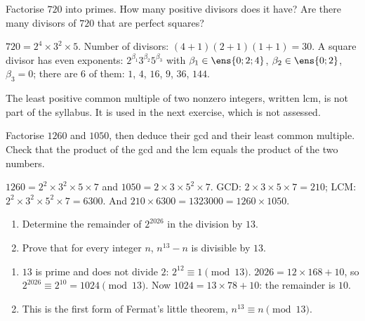 \begin{exercise}
Factorise $720$ into primes. How many positive divisors does it have? Are there many divisors of $720$ that are perfect squares?
\end{exercise}
\begin{solution}
$720=2^4\times3^2\times5$. Number of divisors: $(4+1)(2+1)(1+1)=30$. A square divisor has even exponents: $2^{\beta_1}3^{\beta_2}5^{\beta_3}$ with $\beta_1\in\ens{0;2;4}$, $\beta_2\in\ens{0;2}$, $\beta_3=0$; there are $6$ of them: $1$, $4$, $16$, $9$, $36$, $144$.
\end{solution}

\begin{beyond}The least positive common multiple of two nonzero integers, written lcm, is not part of the syllabus. It is used in the next exercise, which is not assessed.\end{beyond}
\begin{exercise}
Factorise $\num{1260}$ and $\num{1050}$, then deduce their gcd and their least common multiple. Check that the product of the gcd and the lcm equals the product of the two numbers.
\end{exercise}
\begin{solution}
$\num{1260}=2^2\times3^2\times5\times7$ and $\num{1050}=2\times3\times5^2\times7$. GCD: $2\times3\times5\times7=210$; LCM: $2^2\times3^2\times5^2\times7=\num{6300}$. And $210\times\num{6300}=\num{1323000}=\num{1260}\times\num{1050}$.
\end{solution}

\begin{exercise}
\begin{enumerate}
\item Determine the remainder of $2^{2026}$ in the division by $13$.
\item Prove that for every integer $n$, $n^{13}-n$ is divisible by $13$.
\end{enumerate}
\end{exercise}
\begin{solution}
\begin{enumerate}
\item $13$ is prime and does not divide $2$: $2^{12}\equiv1\pmod{13}$. $\num{2026}=12\times168+10$, so $2^{2026}\equiv2^{10}=\num{1024}\pmod{13}$. Now $\num{1024}=13\times78+10$: the remainder is $10$.
\item This is the first form of Fermat's little theorem, $n^{13}\equiv n\pmod{13}$.
\end{enumerate}
\end{solution}

